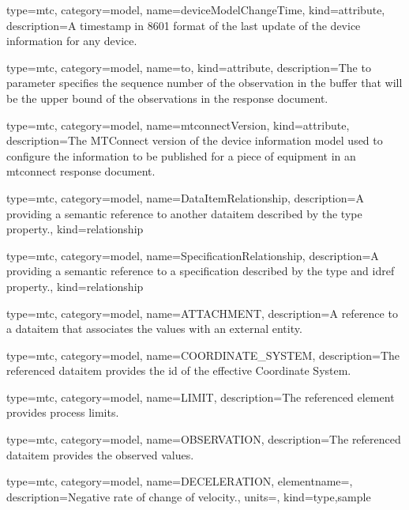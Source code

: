 {
  type=mtc,
  category=model,
  name={deviceModelChangeTime},
  kind={attribute},
  description={A timestamp in 8601 format of the last update of the \gls{device} information for any device.}
}

{
  type=mtc,
  category=model,
  name={to},
  kind={attribute},
  description={The \gls{to} parameter specifies the \gls{sequence number} of the \gls{observation} in the \gls{buffer} that will be the upper bound of the \glspl{observation} in the \gls{response document}.}
}

{
  type=mtc,
  category=model,
  name={mtconnectVersion},
  kind={attribute},
  description={The MTConnect version of the \gls{device information model} used to configure the information to be published for a piece of equipment in an \gls{mtconnect response document}.}
}


{
  type=mtc,
  category=model,
  name={DataItemRelationship},
  description={A  providing a semantic reference to another \gls{dataitem} described by the \gls{type} property.},
  kind={relationship}
}

{
  type=mtc,
  category=model,
  name={SpecificationRelationship},
  description={A  providing a semantic reference to a \gls{specification} described by the \gls{type} and \gls{idref} property.},
  kind={relationship}
}

{
  type=mtc,
  category=model,
  name={ATTACHMENT},
  description={A reference to a \gls{dataitem} that associates the values with an external entity.}
}

{
  type=mtc,
  category=model,
  name={COORDINATE\_SYSTEM},
  description={The referenced \gls{dataitem} provides the \gls{id} of the effective Coordinate System.}
}

{
  type=mtc,
  category=model,
  name={LIMIT},
  description={The referenced element provides process limits.}
}

{
  type=mtc,
  category=model,
  name={OBSERVATION},
  description={The referenced \gls{dataitem} provides the observed values.}
}

{
  type=mtc,
  category=model,
  name={DECELERATION},
  elementname=,
  description={Negative rate of change of velocity.},
  units=,
  kind={type,sample}
}

